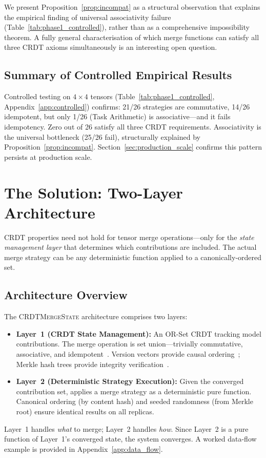 \documentclass[10pt,letterpaper]{article}
\newcommand{\CMS}{\texorpdfstring{{\mdseries\upshape\textsc{CRDTMergeState}}}{CRDTMergeState}}
\begin{document}
We present Proposition~\ref{prop:incompat} as a structural observation that explains the empirical finding of universal associativity failure (Table~\ref{tab:phase1_controlled}), rather than as a comprehensive impossibility theorem.
A fully general characterisation of which merge functions can satisfy all three CRDT axioms simultaneously is an interesting open question.

\subsection{Summary of Controlled Empirical Results}

Controlled testing on $4\times 4$ tensors (Table~\ref{tab:phase1_controlled}, Appendix~\ref{app:controlled}) confirms: 21/26 strategies are commutative, 14/26 idempotent, but only 1/26 (Task Arithmetic) is associative---and it fails idempotency.
Zero out of 26 satisfy all three CRDT requirements.
Associativity is the universal bottleneck (25/26 fail), structurally explained by Proposition~\ref{prop:incompat}.
Section~\ref{sec:production_scale} confirms this pattern persists at production scale.

\section{The Solution: Two-Layer Architecture}\label{sec:solution}

CRDT properties need not hold for tensor merge operations---only for the \emph{state management layer} that determines which contributions are included.
The actual merge strategy can be any deterministic function applied to a canonically-ordered set.

\subsection{Architecture Overview}

The \CMS{} architecture comprises two layers:
\begin{itemize}[leftmargin=*]
\item \textbf{Layer~1 (CRDT State Management):} An OR-Set CRDT tracking model contributions.  The merge operation is set union---trivially commutative, associative, and idempotent~\cite{shapiro2011conflict}.  Version vectors provide causal ordering~\cite{lamport1978time}; Merkle hash trees provide integrity verification~\cite{sanjuan2020merkle}.

\item \textbf{Layer~2 (Deterministic Strategy Execution):} Given the converged contribution set, applies a merge strategy as a deterministic pure function.  Canonical ordering (by content hash) and seeded randomness (from Merkle root) ensure identical results on all replicas.
\end{itemize}
Layer~1 handles \emph{what} to merge; Layer~2 handles \emph{how}.
Since Layer~2 is a pure function of Layer~1's converged state, the system converges.
A worked data-flow example is provided in Appendix~\ref{app:data_flow}.
\end{document}
